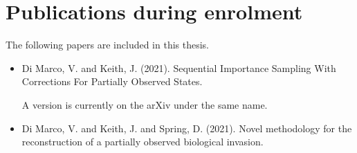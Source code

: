 \section*{Publications during enrolment}

The following papers are included in this thesis.

\begin{itemize}
    \item Di Marco, V. and Keith, J. (2021). Sequential Importance Sampling With Corrections For Partially Observed States.
    
    A version is currently on the arXiv under the same name.
    
    \item Di Marco, V. and Keith, J. and Spring, D. (2021). Novel methodology for the reconstruction of a partially observed biological invasion.
\end{itemize}

\clearpage
